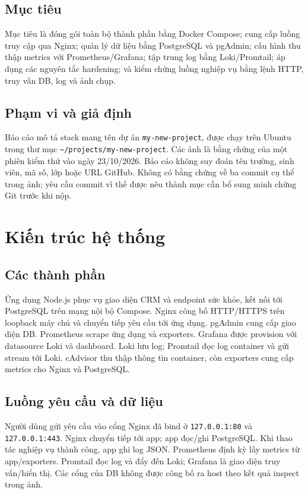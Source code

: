 \documentclass[12pt,a4paper]{report}
\begin{document}
\section{Mục tiêu}
Mục tiêu là đóng gói toàn bộ thành phần bằng Docker Compose; cung cấp luồng truy cập qua Nginx; quản lý dữ liệu bằng PostgreSQL và pgAdmin; cấu hình thu thập metrics với Prometheus/Grafana; tập trung log bằng Loki/Promtail; áp dụng các nguyên tắc hardening; và kiểm chứng luồng nghiệp vụ bằng lệnh HTTP, truy vấn DB, log và ảnh chụp.
\section{Phạm vi và giả định}
Báo cáo mô tả stack mang tên dự án \texttt{my-new-project}, được chạy trên Ubuntu trong thư mục \texttt{\textasciitilde/projects/my-new-project}. Các ảnh là bằng chứng của một phiên kiểm thử vào ngày 23/10/2026. Báo cáo không suy đoán tên trường, sinh viên, mã số, lớp hoặc URL GitHub. Không có bằng chứng về ba commit cụ thể trong ảnh; yêu cầu commit vì thế được nêu thành mục cần bổ sung minh chứng Git trước khi nộp.

\chapter{Kiến trúc hệ thống}
\section{Các thành phần}
Ứng dụng Node.js phục vụ giao diện CRM và endpoint sức khỏe, kết nối tới PostgreSQL trên mạng nội bộ Compose. Nginx công bố HTTP/HTTPS trên loopback máy chủ và chuyển tiếp yêu cầu tới ứng dụng. pgAdmin cung cấp giao diện DB. Prometheus scrape ứng dụng và exporters. Grafana được provision với datasource Loki và dashboard. Loki lưu log; Promtail đọc log container và gửi stream tới Loki. cAdvisor thu thập thông tin container, còn exporters cung cấp metrics cho Nginx và PostgreSQL.
\section{Luồng yêu cầu và dữ liệu}
Người dùng gửi yêu cầu vào cổng Nginx đã bind ở \texttt{127.0.0.1:80} và \texttt{127.0.0.1:443}. Nginx chuyển tiếp tới app; app đọc/ghi PostgreSQL. Khi thao tác nghiệp vụ thành công, app ghi log JSON. Prometheus định kỳ lấy metrics từ app/exporters. Promtail đọc log và đẩy đến Loki; Grafana là giao diện truy vấn/hiển thị. Các cổng của DB không được công bố ra host theo kết quả inspect trong ảnh.
\end{document}
